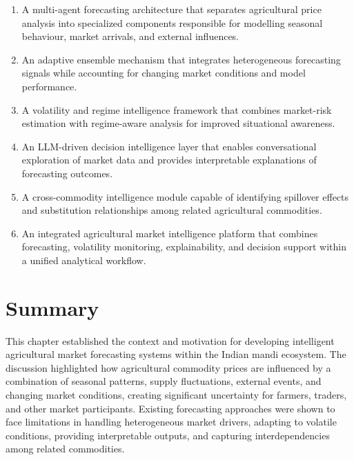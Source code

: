 \documentclass[12pt,a4paper]{report}
\theoremstyle{definition}
\theoremstyle{remark}
\begin{document}
\begin{enumerate}

\item A multi-agent forecasting architecture that separates agricultural price analysis into specialized components responsible for modelling seasonal behaviour, market arrivals, and external influences.

\item An adaptive ensemble mechanism that integrates heterogeneous forecasting signals while accounting for changing market conditions and model performance.

\item A volatility and regime intelligence framework that combines market-risk estimation with regime-aware analysis for improved situational awareness.

\item An LLM-driven decision intelligence layer that enables conversational exploration of market data and provides interpretable explanations of forecasting outcomes.

\item A cross-commodity intelligence module capable of identifying spillover effects and substitution relationships among related agricultural commodities.

\item An integrated agricultural market intelligence platform that combines forecasting, volatility monitoring, explainability, and decision support within a unified analytical workflow.

\end{enumerate}

\section{Summary}

This chapter established the context and motivation for developing intelligent agricultural market forecasting systems within the Indian mandi ecosystem. The discussion highlighted how agricultural commodity prices are influenced by a combination of seasonal patterns, supply fluctuations, external events, and changing market conditions, creating significant uncertainty for farmers, traders, and other market participants. Existing forecasting approaches were shown to face limitations in handling heterogeneous market drivers, adapting to volatile conditions, providing interpretable outputs, and capturing interdependencies among related commodities.
\end{document}

